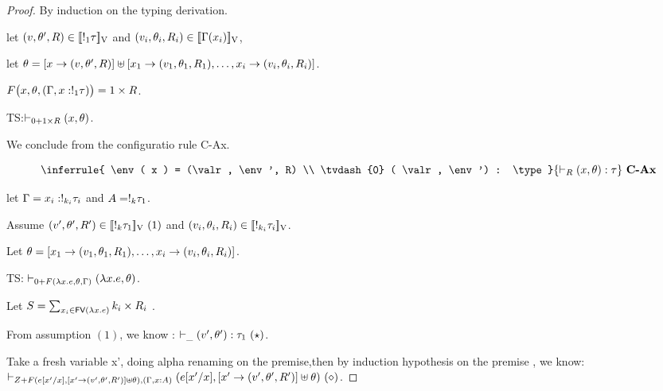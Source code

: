\begin{proof}
  By induction on the typing derivation.\\


  let $(v, \theta', R) \in [\![ !_{1} \tau ]\!]_{\text{V}}$ and $(v_i,
  \theta_i, R_i) \in [\![ \Gamma(x_i) ]\!]_{\text{V}}$,
 

  let $\theta =  [x \to (v, \theta', R)] \uplus [ x_1 \to (v_1,
  \theta_1, R_1), \ldots,   x_i \to (v_i,
  \theta_i, R_i)]   $.

  $F\big(x,\theta, (\Gamma, x: !_{1} \tau) \big) = 1 \times R $.

  TS:$\vdash_{0 +1 \times R} ( x,   \theta  ) $.

   
  
  We conclude from the configuratio rule C-Ax.
  
  \[ \inferrule{
     \env ( x ) = (\valr, \env', R)
      \\
      \tvdash{0} ( \valr, \env') : \type
    }{
     \tvdash{R}   ( x, \env):  \type
    }~\textbf{C-Ax}
  \]


  let $\Gamma = x_i : !_{k_i} \tau_i$ and  $A = !_{k} \tau_1$.

  Assume $(v', \theta', R') \in [\![  !_{k} \tau_1 ]\!]_{\text{V}}~(1)$ and $ (v_i, \theta_i, R_i) \in [\![ !_{k_i} \tau_i  ]\!]_{\text{V}} $.

Let  $ \theta =  [x_1 \to (v_1, \theta_1, R_1), \ldots,   x_i \to (v_i, \theta_i, R_i)]  $.
  
  TS: $ \vdash_{0 + F(\lambda x. e, \theta, \Gamma)  }   (\lambda
  x.e,  \theta) $.
  

  Let $S = \sum_{x_i \in \mathsf{FV} (\lambda x. e) } k_i \times R_i $ .

  From assumption $(1)$, we know :  $\vdash_{\_} ( v', \theta') : \tau_1~(\star)$.

  Take a fresh variable x', doing alpha renaming on the premise,then
  by induction hypothesis on the premise , we know: $\vdash_{ Z+
 F(e[x'/x], [x' \to (v', \theta', R')] \uplus \theta),  (\Gamma,x:
 A) }   ( e[x'/x],  [x' \to (v', \theta', R')] \uplus \theta
) ~(\diamond) $.


\end{proof}
